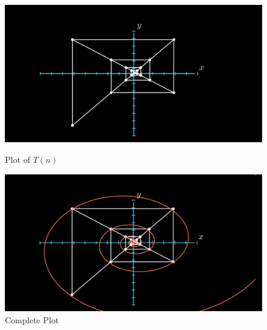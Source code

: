 \documentclass[preprint,12pt]{elsarticle}
\begin{document}
\begin{figure}[t]
	\centering
	\begin{minipage}{0.45\textwidth}
		\centering
		\includegraphics[scale=0.23, trim={3cm 0 6cm 0}, clip]{images/GFKT7.png}
		\caption{Plot of $T(n)$}
	\end{minipage}\hfill
	\begin{minipage}{0.45\textwidth}
		\centering
		\includegraphics[scale=0.23, trim={3cm 0 6cm 0}, clip]{images/GFKT8.png}
		\caption{Complete Plot}
	\end{minipage}
\end{figure}
\end{document}
